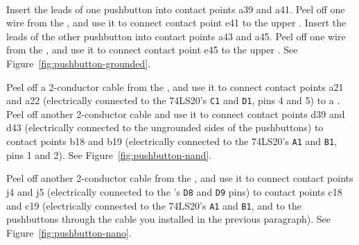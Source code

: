 \disconnect\

Insert the leads of one pushbutton into contact points a39 and a41. Peel off
one wire from the \rainbow, and use it to connect contact point e41 to the
upper \ground. Insert the leads of the other pushbutton into contact points a43
and a45. Peel off one wire from the \rainbow, and use it to connect contact
point e45 to the upper \ground. See Figure~\ref{fig:pushbutton-grounded}.

Peel off a 2-conductor cable from the \rainbow, and use it to connect contact
points a21 and a22 (electrically connected to the 74LS20's \texttt{C1} and
\texttt{D1}, pins 4 and 5) to a \power. Peel off another 2-conductor cable and
use it to connect contact points d39 and d43 (electrically connected to the
ungrounded sides of the pushbuttons) to contact points b18 and b19
(electrically connected to the 74LS20's \texttt{A1} and \texttt{B1}, pins 1 and
2). See Figure~\ref{fig:pushbutton-nand}.

Peel off another 2-conductor cable from the \rainbow, and use
it to connect contact points j4 and j5 (electrically connected to the \nano's
\texttt{D8} and \texttt{D9} pins) to contact points c18 and c19 (electrically
connected to the 74LS20's \texttt{A1} and \texttt{B1}, and to the pushbuttons
through the cable you installed in the previous paragraph). See
Figure~\ref{fig:pushbutton-nano}.

